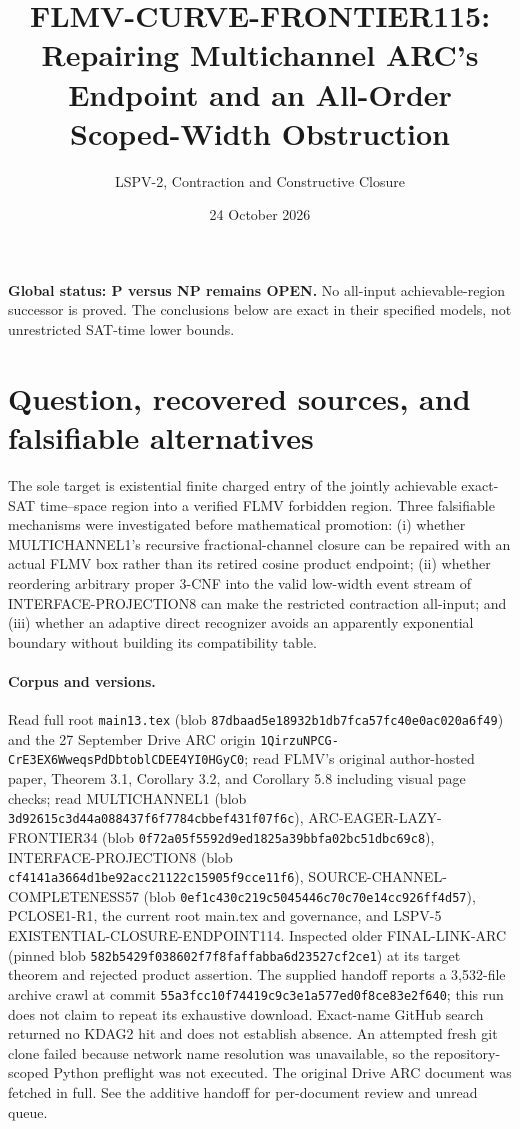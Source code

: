 \documentclass[11pt]{article}
\title{FLMV-CURVE-FRONTIER115: Repairing Multichannel ARC's Endpoint and an All-Order Scoped-Width Obstruction}
\author{LSPV-2, Contraction and Constructive Closure}
\date{24 October 2026}
\begin{document}
\maketitle
\noindent\textbf{Global status: P versus NP remains OPEN.} No all-input achievable-region successor is proved. The conclusions below are exact in their specified models, not unrestricted SAT-time lower bounds.

\section{Question, recovered sources, and falsifiable alternatives}
The sole target is existential finite charged entry of the jointly achievable exact-SAT time--space region into a verified FLMV forbidden region. Three falsifiable mechanisms were investigated before mathematical promotion: (i) whether MULTICHANNEL1's recursive fractional-channel closure can be repaired with an actual FLMV box rather than its retired cosine product endpoint; (ii) whether reordering arbitrary proper 3-CNF into the valid low-width event stream of INTERFACE-PROJECTION8 can make the restricted contraction all-input; and (iii) whether an adaptive direct recognizer avoids an apparently exponential boundary without building its compatibility table.

\paragraph{Corpus and versions.}
Read full root \texttt{main13.tex} (blob \texttt{87dbaad5e18932b1db7fca57fc40e0ac020a6f49}) and the 27 September Drive ARC origin \texttt{1QirzuNPCG-CrE3EX6WweqsPdDbtoblCDEE4YI0HGyC0}; read FLMV's original author-hosted paper, Theorem 3.1, Corollary 3.2, and Corollary 5.8 including visual page checks; read MULTICHANNEL1 (blob \texttt{3d92615c3d44a088437f6f7784cbbef431f07f6c}), ARC-EAGER-LAZY-FRONTIER34 (blob \texttt{0f72a05f5592d9ed1825a39bbfa02bc51dbc69c8}), INTERFACE-PROJECTION8 (blob \texttt{cf4141a3664d1be92acc21122c15905f9cce11f6}), SOURCE-CHANNEL-COMPLETENESS57 (blob \texttt{0ef1c430c219c5045446c70c70e14cc926ff4d57}), PCLOSE1-R1, the current root main.tex and governance, and LSPV-5 EXISTENTIAL-CLOSURE-ENDPOINT114. Inspected older FINAL-LINK-ARC (pinned blob \texttt{582b5429f038602f7f8faffabba6d23527cf2ce1}) at its target theorem and rejected product assertion. The supplied handoff reports a 3,532-file archive crawl at commit \texttt{55a3fcc10f74419c9c3e1a577ed0f8ce83e2f640}; this run does not claim to repeat its exhaustive download. Exact-name GitHub search returned no KDAG2 hit and does not establish absence. An attempted fresh git clone failed because network name resolution was unavailable, so the repository-scoped Python preflight was not executed. The original Drive ARC document was fetched in full. See the additive handoff for per-document review and unread queue.
\end{document}

